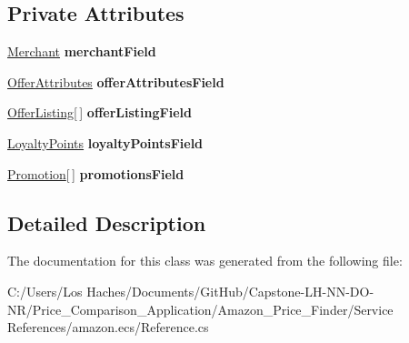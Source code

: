 \subsection*{Private Attributes}
\begin{DoxyCompactItemize}
\item 
\hypertarget{class_price___comparison_1_1amazon_1_1ecs_1_1_offer_a07c855d8446401af6648c3af25de0a56}{\hyperlink{class_price___comparison_1_1amazon_1_1ecs_1_1_merchant}{Merchant} {\bfseries merchant\-Field}}\label{class_price___comparison_1_1amazon_1_1ecs_1_1_offer_a07c855d8446401af6648c3af25de0a56}

\item 
\hypertarget{class_price___comparison_1_1amazon_1_1ecs_1_1_offer_a730a8f01802880593499f255519bd32a}{\hyperlink{class_price___comparison_1_1amazon_1_1ecs_1_1_offer_attributes}{Offer\-Attributes} {\bfseries offer\-Attributes\-Field}}\label{class_price___comparison_1_1amazon_1_1ecs_1_1_offer_a730a8f01802880593499f255519bd32a}

\item 
\hypertarget{class_price___comparison_1_1amazon_1_1ecs_1_1_offer_a608d1f98144dd2ab97d279582e5452b9}{\hyperlink{class_price___comparison_1_1amazon_1_1ecs_1_1_offer_listing}{Offer\-Listing}\mbox{[}$\,$\mbox{]} {\bfseries offer\-Listing\-Field}}\label{class_price___comparison_1_1amazon_1_1ecs_1_1_offer_a608d1f98144dd2ab97d279582e5452b9}

\item 
\hypertarget{class_price___comparison_1_1amazon_1_1ecs_1_1_offer_afe63ab8cb1e80ef52c19352530aaf662}{\hyperlink{class_price___comparison_1_1amazon_1_1ecs_1_1_loyalty_points}{Loyalty\-Points} {\bfseries loyalty\-Points\-Field}}\label{class_price___comparison_1_1amazon_1_1ecs_1_1_offer_afe63ab8cb1e80ef52c19352530aaf662}

\item 
\hypertarget{class_price___comparison_1_1amazon_1_1ecs_1_1_offer_afc01cc3b68c5b16c7460413b0ea7b595}{\hyperlink{class_price___comparison_1_1amazon_1_1ecs_1_1_promotion}{Promotion}\mbox{[}$\,$\mbox{]} {\bfseries promotions\-Field}}\label{class_price___comparison_1_1amazon_1_1ecs_1_1_offer_afc01cc3b68c5b16c7460413b0ea7b595}

\end{DoxyCompactItemize}


\subsection{Detailed Description}


The documentation for this class was generated from the following file\-:\begin{DoxyCompactItemize}
\item 
C\-:/\-Users/\-Los Haches/\-Documents/\-Git\-Hub/\-Capstone-\/\-L\-H-\/\-N\-N-\/\-D\-O-\/\-N\-R/\-Price\-\_\-\-Comparison\-\_\-\-Application/\-Amazon\-\_\-\-Price\-\_\-\-Finder/\-Service References/amazon.\-ecs/Reference.\-cs\end{DoxyCompactItemize}
